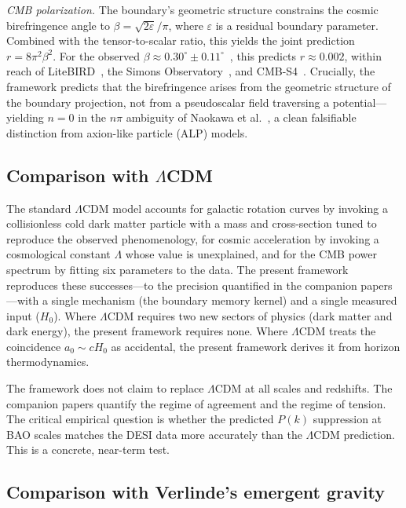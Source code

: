 \documentclass[aps,prd,twocolumn,superscriptaddress,nofootinbib]{revtex4-2}
\begin{document}
\emph{CMB polarization.} The boundary's geometric structure constrains the cosmic birefringence angle to $\beta = \sqrt{2\varepsilon}/\pi$, where $\varepsilon$ is a residual boundary parameter. Combined with the tensor-to-scalar ratio, this yields the joint prediction $r = 8\pi^2\beta^2$. For the observed $\beta \approx 0.30^{\circ} \pm 0.11^{\circ}$~\cite{MinamiKomatsu2020,Eskilt2022}, this predicts $r \approx 0.002$, within reach of LiteBIRD~\cite{LiteBIRD2023}, the Simons Observatory~\cite{SimonsObs2019}, and CMB-S4~\cite{CMBS42016}. Crucially, the framework predicts that the birefringence arises from the geometric structure of the boundary projection, not from a pseudoscalar field traversing a potential---yielding $n = 0$ in the $n\pi$ ambiguity of Naokawa et al.~\cite{Naokawa2024}, a clean falsifiable distinction from axion-like particle (ALP) models.

\subsection{Comparison with $\Lambda$CDM}

The standard $\Lambda$CDM model accounts for galactic rotation curves by invoking a collisionless cold dark matter particle with a mass and cross-section tuned to reproduce the observed phenomenology, for cosmic acceleration by invoking a cosmological constant $\Lambda$ whose value is unexplained, and for the CMB power spectrum by fitting six parameters to the data. The present framework reproduces these successes---to the precision quantified in the companion papers---with a single mechanism (the boundary memory kernel) and a single measured input ($H_0$). Where $\Lambda$CDM requires two new sectors of physics (dark matter and dark energy), the present framework requires none. Where $\Lambda$CDM treats the coincidence $a_0 \sim cH_0$ as accidental, the present framework derives it from horizon thermodynamics.

The framework does not claim to replace $\Lambda$CDM at all scales and redshifts. The companion papers quantify the regime of agreement and the regime of tension. The critical empirical question is whether the predicted $P(k)$ suppression at BAO scales matches the DESI data more accurately than the $\Lambda$CDM prediction. This is a concrete, near-term test.

\subsection{Comparison with Verlinde's emergent gravity}
\end{document}
